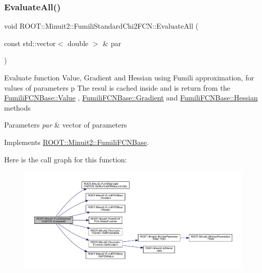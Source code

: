 \subsubsection{\texorpdfstring{EvaluateAll()}{EvaluateAll()}\hspace{0.1cm}{\footnotesize\ttfamily [2/3]}}
{\footnotesize\ttfamily void R\+O\+O\+T\+::\+Minuit2\+::\+Fumili\+Standard\+Chi2\+F\+C\+N\+::\+Evaluate\+All (\begin{DoxyParamCaption}\item[{const std\+::vector$<$ double $>$ \&}]{par }\end{DoxyParamCaption})\hspace{0.3cm}{\ttfamily [virtual]}}

Evaluate function Value, Gradient and Hessian using Fumili approximation, for values of parameters p The resul is cached inside and is return from the \mbox{\hyperlink{classROOT_1_1Minuit2_1_1FumiliFCNBase_a221dacee0ccde747a271a0cecd759f98}{Fumili\+F\+C\+N\+Base\+::\+Value}} , \mbox{\hyperlink{classROOT_1_1Minuit2_1_1FumiliFCNBase_ad226939ea2e83f754b5a6afc30876d3e}{Fumili\+F\+C\+N\+Base\+::\+Gradient}} and \mbox{\hyperlink{classROOT_1_1Minuit2_1_1FumiliFCNBase_ade134d8c6613393e942ef98d445db376}{Fumili\+F\+C\+N\+Base\+::\+Hessian}} methods


\begin{DoxyParams}{Parameters}
{\em par} & vector of parameters \\
\hline
\end{DoxyParams}


Implements \mbox{\hyperlink{classROOT_1_1Minuit2_1_1FumiliFCNBase_a0741bb4a7405cc33ab60583472a189cb}{R\+O\+O\+T\+::\+Minuit2\+::\+Fumili\+F\+C\+N\+Base}}.

Here is the call graph for this function\+:
\nopagebreak
\begin{figure}[H]
\begin{center}
\leavevmode
\includegraphics[width=350pt]{d8/db2/classROOT_1_1Minuit2_1_1FumiliStandardChi2FCN_a76f42b6e5d2a92961a9fd8feca38b582_cgraph}
\end{center}
\end{figure}
\mbox{\label{classROOT_1_1Minuit2_1_1FumiliStandardChi2FCN_ace15dd1aad435e460c523bc37bff12a8}} 

